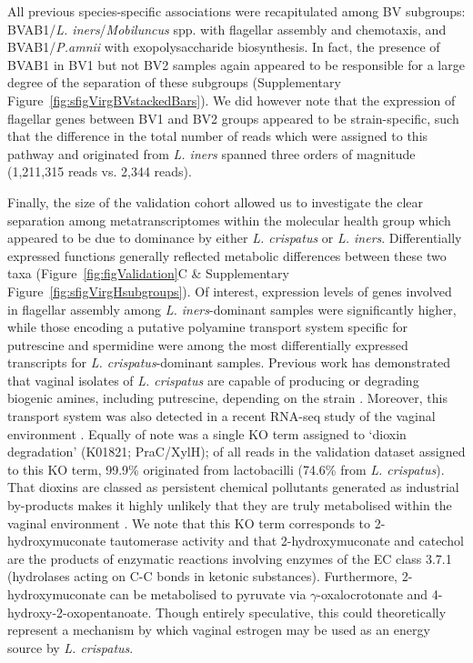 \documentclass[sn-mathphys,Numbered]{sn-jnl}%
\begin{document}
All previous species-specific associations were recapitulated among BV subgroups: BVAB1/\textit{L. iners}/\textit{Mobiluncus} spp. with flagellar assembly and chemotaxis, and BVAB1/\textit{P.amnii} with exopolysaccharide biosynthesis. In fact, the presence of BVAB1 in BV1 but not BV2 samples again appeared to be responsible for a large degree of the separation of these subgroups (Supplementary Figure~\ref{fig:sfigVirgBVstackedBars}). We did however note that the expression of flagellar genes between BV1 and BV2 groups appeared to be strain-specific, such that the difference in the total number of reads which were assigned to this pathway and originated from \textit{L. iners} spanned three orders of magnitude (1,211,315 reads vs. 2,344 reads).

Finally, the size of the validation cohort allowed us to investigate the clear separation among metatranscriptomes within the molecular health group which appeared to be due to dominance by either \textit{L. crispatus} or \textit{L. iners}. Differentially expressed functions generally reflected metabolic differences between these two taxa (Figure~\ref{fig:figValidation}C \& Supplementary Figure~\ref{fig:sfigVirgHsubgroups}). Of interest, expression levels of genes involved in flagellar assembly among \textit{L. iners}-dominant samples were significantly higher, while those encoding a putative polyamine transport system specific for putrescine and spermidine were among the most differentially expressed transcripts for \textit{L. crispatus}-dominant samples. Previous work has demonstrated that vaginal isolates of \textit{L. crispatus} are capable of producing or degrading biogenic amines, including putrescine, depending on the strain \citep{puebla_barragan_amines_2021}. Moreover, this transport system was also detected in a recent RNA-seq study of the vaginal environment \citep{France:2022aa}. Equally of note was a single KO term assigned to `dioxin degradation' (K01821; PraC/XylH); of all reads in the validation dataset assigned to this KO term, 99.9\% originated from lactobacilli (74.6\% from \textit{L. crispatus}). That dioxins are classed as persistent chemical pollutants generated as industrial by-products makes it highly unlikely that they are truly metabolised within the vaginal environment \citep{hutzinger_sources_1985}. We note that this KO term corresponds to 2-hydroxymuconate tautomerase activity and that 2-hydroxymuconate and catechol are the products of enzymatic reactions involving enzymes of the EC class 3.7.1 (hydrolases acting on C-C bonds in ketonic substances). Furthermore, 2-hydroxymuconate can be metabolised to pyruvate via $\gamma$-oxalocrotonate and 4-hydroxy-2-oxopentanoate. Though entirely speculative, this could theoretically represent a mechanism by which vaginal estrogen may be used as an energy source by \textit{L. crispatus}.
\end{document}
